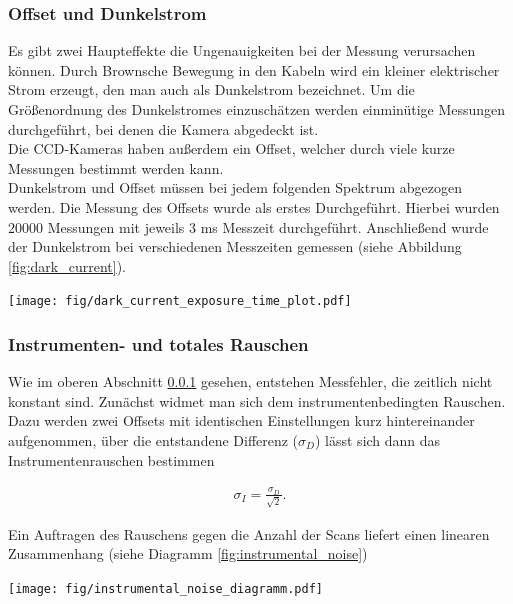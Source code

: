 \documentclass[12pt, a4paper, bibliography=totoc]{scrartcl}
\begin{document}
\begin{multicols}{2}
\subsubsection{Offset und Dunkelstrom}\label{sssec:O&D}

Es gibt zwei Haupteffekte die Ungenauigkeiten bei der Messung verursachen können.
Durch Brownsche Bewegung in den Kabeln wird ein kleiner elektrischer Strom erzeugt, den man auch als Dunkelstrom bezeichnet.
Um die Größenordnung des Dunkelstromes einzuschätzen werden einminütige Messungen durchgeführt, bei denen die Kamera abgedeckt ist.\\
Die CCD-Kameras haben außerdem ein Offset, welcher durch viele kurze Messungen bestimmt werden kann.\\
Dunkelstrom und Offset müssen bei jedem folgenden Spektrum abgezogen werden.
Die Messung des Offsets wurde als erstes Durchgeführt. 
Hierbei wurden $20000$ Messungen mit jeweils $3$ \si{ms} Messzeit durchgeführt.
Anschließend wurde der Dunkelstrom bei verschiedenen Messzeiten gemessen (siehe Abbildung \ref{fig:dark_current}).
    
\begin{center}
	\texttt{[image: fig/dark\_current\_exposure\_time\_plot.pdf]}
	\label{fig:dark_current}
\end{center}

\subsubsection{Instrumenten- und totales Rauschen}\label{sssec:instrumental_total_noise}

Wie im oberen Abschnitt \ref{sssec:O&D} gesehen, entstehen Messfehler, die zeitlich nicht konstant sind. Zunächst widmet man sich dem instrumentenbedingten Rauschen.
Dazu werden zwei Offsets mit identischen Einstellungen kurz hintereinander aufgenommen, über die entstandene Differenz ($\sigma_D$) lässt sich dann das Instrumentenrauschen bestimmen 

\begin{align}
\sigma_{I} = \frac{\sigma_D}{\sqrt{2}}.\label{eq:instrumental_noise}
\end{align}

Ein Auftragen des Rauschens gegen die Anzahl der Scans liefert einen linearen Zusammenhang (siehe Diagramm \ref{fig:instrumental_noise})

\begin{center}
	\texttt{[image: fig/instrumental\_noise\_diagramm.pdf]}
	\label{fig:instrumental_noise}
\end{center}  


\end{multicols}
\end{document}
